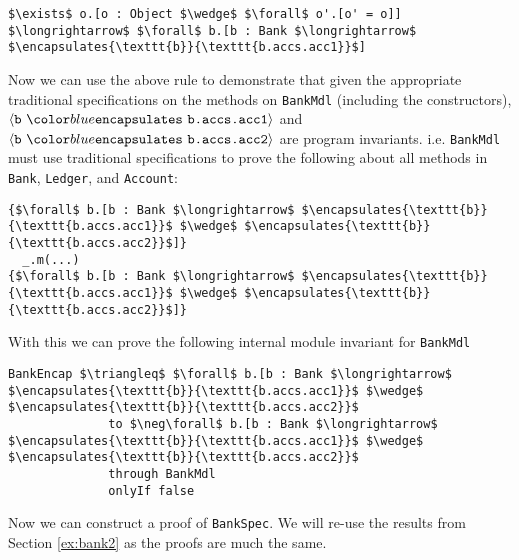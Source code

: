 \documentclass[acmsmall,review,anonymous]{acmart}\settopmatter{printfolios=true,printccs=false,printacmref=false}
\begin{document}
\begin{lstlisting}[language = Chainmail, mathescape=true, frame=single]
$\exists$ o.[o : Object $\wedge$ $\forall$ o'.[o' = o]] $\longrightarrow$ $\forall$ b.[b : Bank $\longrightarrow$ $\encapsulates{\texttt{b}}{\texttt{b.accs.acc1}}$]
\end{lstlisting}
Now we can use the above rule to demonstrate that given the appropriate
traditional specifications on the methods on \texttt{BankMdl} (including the constructors), 
$\encapsulates{\texttt{b}}{\texttt{b.accs.acc1}}$ and $\encapsulates{\texttt{b}}{\texttt{b.accs.acc2}}$ 
are program invariants. i.e. \texttt{BankMdl} must use traditional specifications to 
prove the following about all methods in \texttt{Bank}, \texttt{Ledger}, and \texttt{Account}:
\begin{lstlisting}[language = Chainmail, mathescape=true, frame=lines]
{$\forall$ b.[b : Bank $\longrightarrow$ $\encapsulates{\texttt{b}}{\texttt{b.accs.acc1}}$ $\wedge$ $\encapsulates{\texttt{b}}{\texttt{b.accs.acc2}}$]}
  _.m(...)
{$\forall$ b.[b : Bank $\longrightarrow$ $\encapsulates{\texttt{b}}{\texttt{b.accs.acc1}}$ $\wedge$ $\encapsulates{\texttt{b}}{\texttt{b.accs.acc2}}$]}
\end{lstlisting}
With this we can prove the following internal module invariant for \texttt{BankMdl}
\begin{lstlisting}[language = Chainmail, mathescape=true, frame=lines]
BankEncap $\triangleq$ $\forall$ b.[b : Bank $\longrightarrow$ $\encapsulates{\texttt{b}}{\texttt{b.accs.acc1}}$ $\wedge$ $\encapsulates{\texttt{b}}{\texttt{b.accs.acc2}}$
              to $\neg\forall$ b.[b : Bank $\longrightarrow$ $\encapsulates{\texttt{b}}{\texttt{b.accs.acc1}}$ $\wedge$ $\encapsulates{\texttt{b}}{\texttt{b.accs.acc2}}$
              through BankMdl
              onlyIf false
\end{lstlisting}

Now we can construct a proof of \texttt{BankSpec}. We will re-use the results from Section \ref{ex:bank2} 
as the proofs are much the same.
\end{document}

